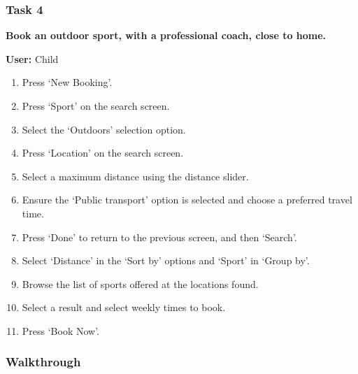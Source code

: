 \subsubsection{Task 4}
\label{ssub:task_4}

\textbf{Book an outdoor sport, with a professional coach, close to home.}

\textbf{User:} Child
\begin{enumerate}
	\item Press `New Booking'.
	\item Press `Sport' on the search screen.
	\item Select the `Outdoors' selection option.
	\item Press `Location' on the search screen.
	\item Select a maximum distance using the distance slider.
	\item Ensure the `Public transport' option is selected and choose a
		preferred travel time.
	\item Press `Done' to return to the previous screen, and then `Search'.
	\item Select `Distance' in the `Sort by' options and `Sport' in `Group by'.
	\item Browse the list of sports offered at the locations found.
	\item Select a result and select weekly times to book.
	\item Press `Book Now'.
\end{enumerate}

\subsubsection{Walkthrough}

